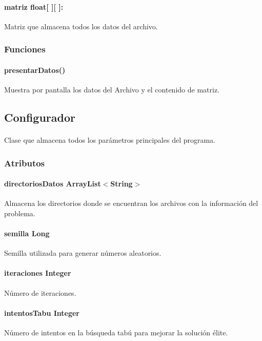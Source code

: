 \documentclass{article}
\begin{document}
	\paragraph{matriz float[ ][ ]:}Matriz que almacena todos los datos del archivo.
	
	\subsubsection{Funciones}
	
	\paragraph{presentarDatos()}Muestra por pantalla los datos del Archivo y el contenido de matriz.
	
	\subsection{Configurador}
	
	\paragraph{}Clase que almacena todos los parámetros principales del programa.
	
	\subsubsection{Atributos}
	
	\paragraph{directoriosDatos ArrayList$<$String$>$} Almacena los directorios donde se encuentran los archivos con la información del problema.
	
	\paragraph{semilla Long}Semilla utilizada para generar números aleatorios.
	
	\paragraph{iteraciones Integer} Número de iteraciones.
	
	\paragraph{intentosTabu Integer} Número de intentos en la búsqueda tabú para mejorar la solución élite.
	
\end{document}
